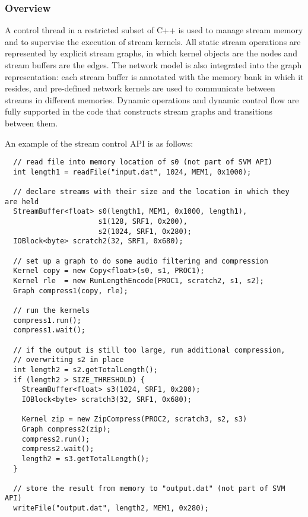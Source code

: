 \subsubsection{Overview}
\label{sec:streamover}

A control thread in a restricted subset of C++ is used to manage
stream memory and to supervise the execution of stream kernels.  All
static stream operations are represented by explicit stream graphs, in
which kernel objects are the nodes and stream buffers are the edges.
The network model is also integrated into the graph representation:
each stream buffer is annotated with the memory bank in which it
resides, and pre-defined network kernels are used to communicate
between streams in different memories.  Dynamic operations and dynamic
control flow are fully supported in the code that constructs stream
graphs and transitions between them.

An example of the stream control API is as follows:
{\small
\begin{verbatim}
  // read file into memory location of s0 (not part of SVM API)
  int length1 = readFile("input.dat", 1024, MEM1, 0x1000);

  // declare streams with their size and the location in which they are held
  StreamBuffer<float> s0(length1, MEM1, 0x1000, length1), 
                      s1(128, SRF1, 0x200), 
                      s2(1024, SRF1, 0x280);
  IOBlock<byte> scratch2(32, SRF1, 0x680);

  // set up a graph to do some audio filtering and compression
  Kernel copy = new Copy<float>(s0, s1, PROC1);
  Kernel rle  = new RunLengthEncode(PROC1, scratch2, s1, s2);
  Graph compress1(copy, rle);

  // run the kernels
  compress1.run();
  compress1.wait();

  // if the output is still too large, run additional compression, 
  // overwriting s2 in place
  int length2 = s2.getTotalLength();
  if (length2 > SIZE_THRESHOLD) {
    StreamBuffer<float> s3(1024, SRF1, 0x280);
    IOBlock<byte> scratch3(32, SRF1, 0x680);
    
    Kernel zip = new ZipCompress(PROC2, scratch3, s2, s3)
    Graph compress2(zip);
    compress2.run();
    compress2.wait();
    length2 = s3.getTotalLength();
  }

  // store the result from memory to "output.dat" (not part of SVM API)
  writeFile("output.dat", length2, MEM1, 0x280);
\end{verbatim}}


